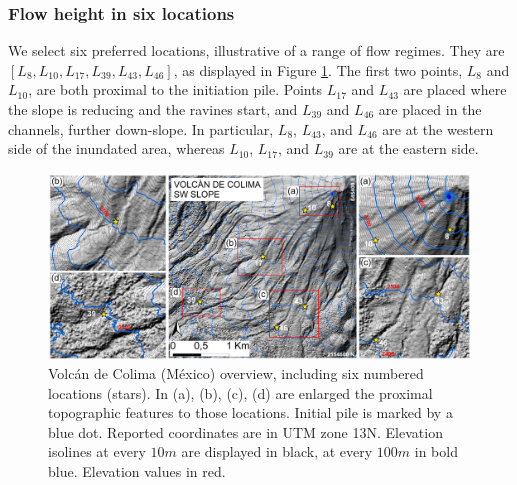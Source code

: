 \documentclass{article}
\begin{document}
\subsubsection{Flow height in six locations}\label{Obs2}
We select six preferred locations, illustrative of a range of flow regimes. They are $[L_8, L_{10}, L_{17}, L_{39}, L_{43}, L_{46}]$, as displayed in Figure \ref{fig:Colima-extra}. The first two points, $L_8$ and $L_{10}$, are both proximal to the initiation pile. Points $L_{17}$ and $L_{43}$ are placed where the slope is reducing and the ravines start, and $L_{39}$ and $L_{46}$ are placed in the channels, further down-slope. In particular, $L_8$, $L_{43}$, and $L_{46}$ are at the western side of the inundated area, whereas $L_{10}$, $L_{17}$, and $L_{39}$ are at the eastern side.
\begin{figure}[H]
         \centering
        \includegraphics[width=1\textwidth]{figures/Colima/FigExtra.jpg}
        \caption{Volc{\'a}n de Colima (M{\'e}xico) overview, including six numbered locations (stars). In (a), (b), (c), (d) are enlarged the proximal topographic features to those locations. Initial pile is marked by a blue dot. Reported coordinates are in UTM zone 13N. Elevation isolines at every $10 m$ are displayed in black, at every $100m$ in bold blue. Elevation values in red.}
        \label{fig:Colima-extra}
\end{figure}
\end{document}

